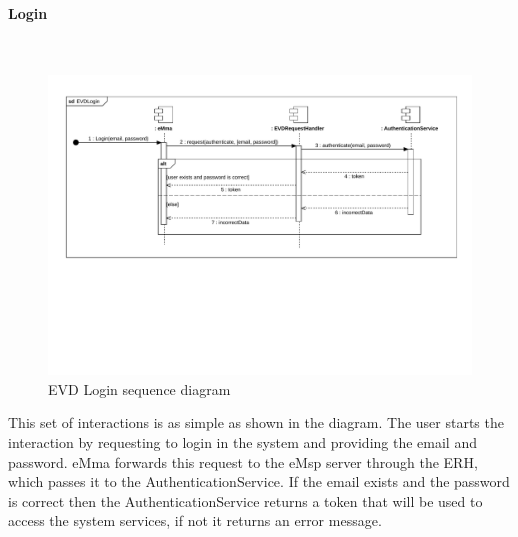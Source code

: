 \paragraph{Login}\mbox{}\
\begin{figure}[H]
    \centering
    \includegraphics[trim={0 8cm 0 0},clip, width=1\textwidth]{Images/cp2/runtime/Login.pdf}
    \caption{EVD Login sequence diagram}
\end{figure}
This set of interactions is as simple as shown in the diagram. The user starts the interaction by requesting to login in the system and providing the email and password. eMma forwards this request to the eMsp server through the ERH, which passes it to the AuthenticationService. If the email exists and the password is correct then the AuthenticationService returns a token that will be used to access the system services, if not it returns an error message.

\pagebreak
